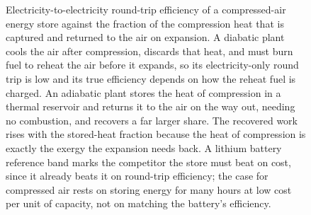 \begin{figure}[htbp]
\centering
{}
\caption[Compressed-air storage round-trip efficiency]{Electricity-to-electricity
round-trip efficiency of a compressed-air energy store against the fraction of the
compression heat that is captured and returned to the air on expansion. A diabatic
plant cools the air after compression, discards that heat, and must burn fuel to
reheat the air before it expands, so its electricity-only round trip is low and its
true efficiency depends on how the reheat fuel is charged. An adiabatic plant
stores the heat of compression in a thermal reservoir and returns it to the air on
the way out, needing no combustion, and recovers a far larger share. The recovered
work rises with the stored-heat fraction because the heat of compression is exactly
the exergy the expansion needs back. A lithium battery reference band marks the
competitor the store must beat on cost, since it already beats it on round-trip
efficiency; the case for compressed air rests on storing energy for many hours at
low cost per unit of capacity, not on matching the battery's efficiency.}
\label{fig:vol04ch03:caes-roundtrip}
\end{figure}
